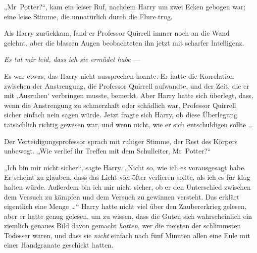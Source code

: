 „Mr~Potter?“, kam ein leiser Ruf, nachdem Harry um zwei Ecken gebogen war; eine leise Stimme, die unnatürlich durch die Flure trug.

Als Harry zurückkam, fand er Professor Quirrell immer noch an die Wand gelehnt, aber die blassen Augen beobachteten ihn jetzt mit scharfer Intelligenz.

\emph{Es tut mir leid, dass ich sie ermüdet habe} —

Es war etwas, das Harry nicht aussprechen konnte. Er hatte die Korrelation zwischen der Anstrengung, die Professor Quirrell aufwandte, und der Zeit, die er mit ‚Ausruhen‘ verbringen musste, bemerkt. Aber Harry hatte sich überlegt, dass, wenn die Anstrengung zu schmerzhaft oder schädlich war, Professor Quirrell sicher einfach nein sagen würde. Jetzt fragte sich Harry, ob diese Überlegung tatsächlich richtig gewesen war, und wenn nicht, wie er sich entschuldigen sollte …

Der Verteidigungsprofessor sprach mit ruhiger Stimme, der Rest des Körpers unbewegt.
„Wie verlief ihr Treffen mit dem Schulleiter, Mr~Potter?“

„Ich bin mir nicht sicher“, sagte Harry.
„Nicht so, wie ich es vorausgesagt habe. Er scheint zu glauben, dass das Licht viel öfter verlieren sollte, als ich es für klug halten würde. Außerdem bin ich mir nicht sicher, ob er den Unterschied zwischen dem Versuch zu kämpfen und dem Versuch zu gewinnen versteht. Das erklärt eigentlich eine Menge …“ Harry hatte nicht viel über den Zaubererkrieg gelesen, aber er hatte genug gelesen, um zu wissen, dass die Guten sich wahrscheinlich ein ziemlich genaues Bild davon gemacht \emph{hatten}, wer die meisten der schlimmsten Todesser waren, und dass sie \emph{nicht} einfach nach fünf Minuten allen eine Eule mit einer Handgranate geschickt hatten.

